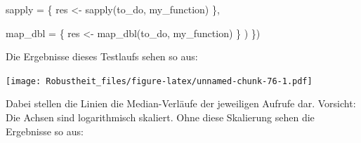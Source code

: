 \documentclass[
]{book}
\newenvironment{Shaded}{\begin{snugshade}}{\end{snugshade}}
\newcommand{\AttributeTok}[1]{\textcolor[rgb]{0.77,0.63,0.00}{#1}}
\newcommand{\DecValTok}[1]{\textcolor[rgb]{0.00,0.00,0.81}{#1}}
\newcommand{\FunctionTok}[1]{\textcolor[rgb]{0.00,0.00,0.00}{#1}}
\newcommand{\NormalTok}[1]{#1}
\newcommand{\OtherTok}[1]{\textcolor[rgb]{0.56,0.35,0.01}{#1}}
\newcommand{\SpecialCharTok}[1]{\textcolor[rgb]{0.00,0.00,0.00}{#1}}
\newcommand{\StringTok}[1]{\textcolor[rgb]{0.31,0.60,0.02}{#1}}
\begin{document}
\begin{Shaded}
\begin{Highlighting}[]
                            \AttributeTok{sapply =}\NormalTok{ \{}
\NormalTok{                              res }\OtherTok{\textless{}{-}} \FunctionTok{sapply}\NormalTok{(to\_do, my\_function)}
\NormalTok{                            \},}
                            
                            \AttributeTok{map\_dbl =}\NormalTok{ \{}
\NormalTok{                              res }\OtherTok{\textless{}{-}} \FunctionTok{map\_dbl}\NormalTok{(to\_do, my\_function)}
\NormalTok{                            \}}
\NormalTok{                          )}
\NormalTok{                        \})}
\end{Highlighting}
\end{Shaded}

Die Ergebnisse dieses Testlaufs sehen so aus:

\texttt{[image: Robustheit\_files/figure-latex/unnamed-chunk-76-1.pdf]}

Dabei stellen die Linien die Median-Verläufe der jeweiligen Aufrufe dar. Vorsicht: Die Achsen sind logarithmisch skaliert. Ohne diese Skalierung sehen die Ergebnisse so aus:

\begin{Shaded}
\end{Shaded}
\end{document}
